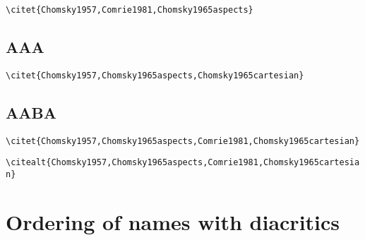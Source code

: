         \citet{Chomsky1957}            


\bigskip
\verb+\citet{Chomsky1957,Comrie1981,Chomsky1965aspects}+

       \citet{Chomsky1957,Comrie1981,Chomsky1965aspects} 

 
 
\subsection{AAA} 

\bigskip
\verb+\citet{Chomsky1957,Chomsky1965aspects,Chomsky1965cartesian}+

       \citet{Chomsky1957,Chomsky1965aspects,Chomsky1965cartesian} 
 
\subsection{AABA} 
\bigskip
\verb+\citet{Chomsky1957,Chomsky1965aspects,Comrie1981,Chomsky1965cartesian}+

       \citet{Chomsky1957,Chomsky1965aspects,Comrie1981,Chomsky1965cartesian} 
\bigskip
\verb+\citealt{Chomsky1957,Chomsky1965aspects,Comrie1981,Chomsky1965cartesian}+

       \citealt{Chomsky1957,Chomsky1965aspects,Comrie1981,Chomsky1965cartesian} 

 
\section{Ordering of names with diacritics} 
\citet{Circov1900,MeierCircovac1900}
